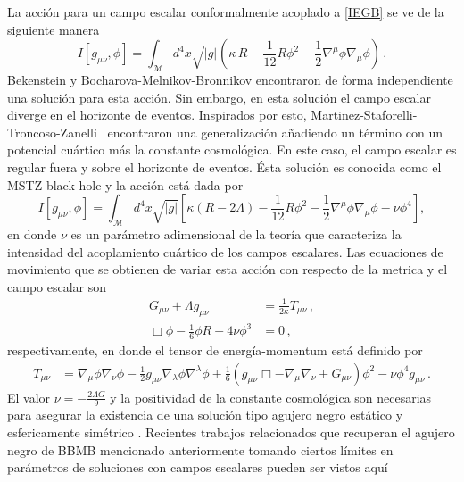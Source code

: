 \documentclass[../Main.tex]{subfiles}
\begin{document}
La acción para un campo escalar conformalmente acoplado a \eqref{IEGB} se ve de la siguiente manera
\begin{equation}
    I[g_{\mu\nu},\phi]=\int_{\mathcal{M}} d^{4}x \sqrt{\lvert g\rvert}\left(\kappa\,R -\frac{1}{12} R\phi^2-\frac{1}{2} \nabla^{\mu}\phi\nabla_{\mu}\phi\right)\,.
\end{equation}
Bekenstein \cite{Bekenstein:1974sf,bekenstein1973black} y Bocharova-Melnikov-Bronnikov \cite{Bocharova:1970skc} encontraron de forma independiente una solución para esta acción. Sin embargo, en esta solución el campo escalar diverge en el horizonte de eventos. Inspirados por esto, Martinez-Staforelli-Troncoso-Zanelli~\cite{Martinez:2002ru,Martinez:2005di} encontraron una generalización añadiendo un término con un potencial cuártico más la constante cosmológica. En este caso, el campo escalar es regular fuera y sobre el horizonte de eventos. Ésta solución es conocida como el MSTZ black hole y la acción está dada por
\begin{equation}
    I[g_{\mu\nu},\phi]=\int_{\mathcal{M}} d^{4}x \sqrt{\lvert g\rvert}\left[\kappa(R-2\Lambda) -\frac{1}{12} R\phi^2-\frac{1}{2} \nabla^{\mu}\phi\nabla_{\mu}\phi-\nu\phi^4\right],
\end{equation}
en donde $\nu$ es un parámetro adimensional de la teoría que caracteriza la intensidad del acoplamiento cuártico de los campos escalares. Las ecuaciones de movimiento que se obtienen de variar esta acción con respecto de la metrica y el campo escalar son
\begin{align}
 G_{\mu\nu}+\Lambda g_{\mu\nu}&=\frac{1}{2\kappa} T_{\mu\nu}\, ,\\
   \Box\phi - \frac{1}{6}\phi R - 4\nu\phi^3 &= 0\,,
\end{align}
respectivamente, en donde el tensor de energía-momentum está definido por
\begin{align}
T_{\mu\nu} &= \nabla_\mu\phi\nabla_\nu\phi - \frac{1}{2}g_{\mu\nu}\nabla_\lambda\phi\nabla^\lambda\phi + \frac{1}{6}\left(g_{\mu\nu}\Box - \nabla_\mu\nabla_\nu + G_{\mu\nu} \right)\phi^2 - \nu\phi^4 g_{\mu\nu} \,.
\label{Ttensor}
\end{align}
El valor $\nu=-\tfrac{2\Lambda G}{9}$ y la positividad de la constante cosmológica son necesarias para asegurar la existencia de una solución tipo agujero negro estático y esfericamente simétrico \cite{Martinez:2002ru}. Recientes trabajos relacionados que recuperan el agujero negro de BBMB mencionado anteriormente tomando ciertos límites en parámetros de soluciones con campos escalares pueden ser vistos aquí \cite{Barrientos:2022avi, Barrientos:2023tqb}
\end{document}
